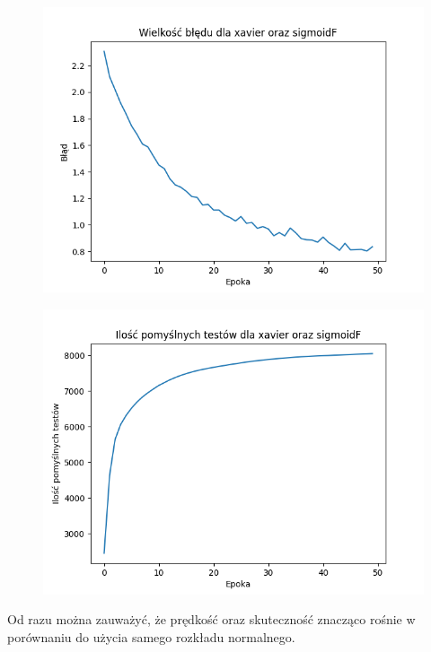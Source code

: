 \documentclass{article}
\begin{document}
\newpage
\begin{figure}[!htb]
  \centering
  \includegraphics[width=\linewidth]{error_xavier_sigmoidF.png}
\end{figure}

\begin{figure}[!htb]
  \centering
  \includegraphics[width=\linewidth]{test_xavier_sigmoidF.png}
\end{figure}

Od razu można zauważyć, że prędkość oraz skuteczność znacząco rośnie w porównaniu do użycia samego rozkładu normalnego.
\end{document}
